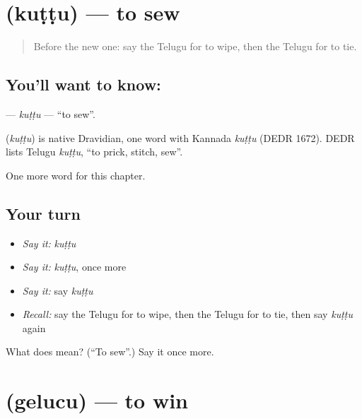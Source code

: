 \section[\texorpdfstring{\te{కుట్టు} (kuṭṭu)}{కుట్టు (kuṭṭu)}]{ (kuṭṭu) — to sew}

\label{lesson:TE-C147-kuttu}



\begin{quote}
Before the new one: say the Telugu for to wipe, then the Telugu for to tie.
\end{quote}

\subsection*{You'll want to know: }
\textbf{} — \emph{kuṭṭu} — \textquotedblleft{}to sew\textquotedblright{}.

\begin{cousinweb}
\textbf{} (\emph{kuṭṭu}) is native Dravidian, one word with Kannada \emph{kuṭṭu} (DEDR 1672). DEDR lists Telugu \emph{kuṭṭu}, \textquotedblleft{}to prick, stitch, sew\textquotedblright{}.
\end{cousinweb}

\begin{grammarlens}[title={What you've built}]
One more word for this chapter.
\end{grammarlens}

\subsection*{Your turn}
\begin{itemize}
\raggedright
  \item \emph{Say it:} \emph{kuṭṭu}
  \item \emph{Say it:} \emph{kuṭṭu}, once more
  \item \emph{Say it:} say \emph{kuṭṭu}
  \item \emph{Recall:} say the Telugu for to wipe, then the Telugu for to tie, then say \emph{kuṭṭu} again
\end{itemize}

\begin{tcolorbox}[breakable,colback=teal!4,colframe=teal!35!black,title={Before you move on}]
What does  mean? (\textquotedblleft{}To sew\textquotedblright{}.) Say it once more.
\end{tcolorbox}
\section[\texorpdfstring{\te{గెలుచు} (gelucu)}{గెలుచు (gelucu)}]{ (gelucu) — to win}

